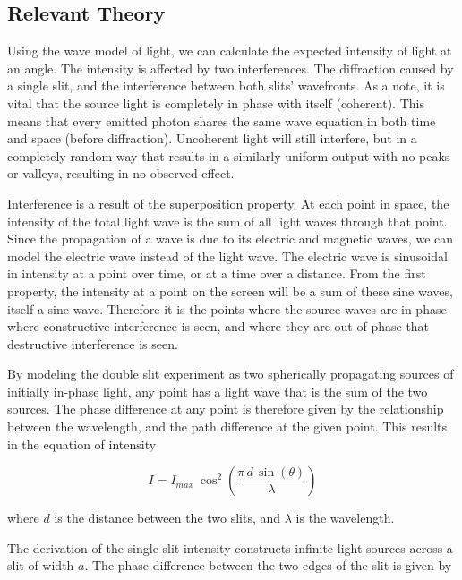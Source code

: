 \subsection*{Relevant Theory}
\label {sec:theory}

Using the wave model of light, we can calculate the expected intensity of light at an angle. The intensity is affected by two interferences. The diffraction caused by a single slit, and the interference between both slits' wavefronts. As a note, it is vital that the source light is completely in phase with itself (coherent). This means that every emitted photon shares the same wave equation in both time and space (before diffraction). Uncoherent light will still interfere, but in a completely random way that results in a similarly uniform output with no peaks or valleys, resulting in no observed effect.

Interference is a result of the superposition property. At each point in space, the intensity of the total light wave is the sum of all light waves through that point. Since the propagation of a wave is due to its electric and magnetic waves, we can model the electric wave instead of the light wave. The electric wave is sinusoidal in intensity at a point over time, or at a time over a distance. From the first property, the intensity at a point on the screen will be a sum of these sine waves, itself a sine wave. Therefore it is the points where the source waves are in phase where constructive interference is seen, and where they are out of phase that destructive interference is seen.

By modeling the double slit experiment as two spherically propagating sources of initially in-phase light, any point has a light wave that is the sum of the two sources. The phase difference at any point is therefore given by the relationship between the wavelength, and the path difference at the given point. This results in the equation of intensity 

\begin{equation}
	\label{eqn:DoubleSlitIntensity}
I = I_{max} ~ \cos^2 \left(\frac{\pi \, d \, \sin(\theta)}{\lambda}\right)
\end{equation}

where $d$ is the distance between the two slits, and $\lambda$ is the wavelength.

The derivation of the single slit intensity constructs infinite light sources across a slit of width $a$. The phase difference between the two edges of the slit is given by

